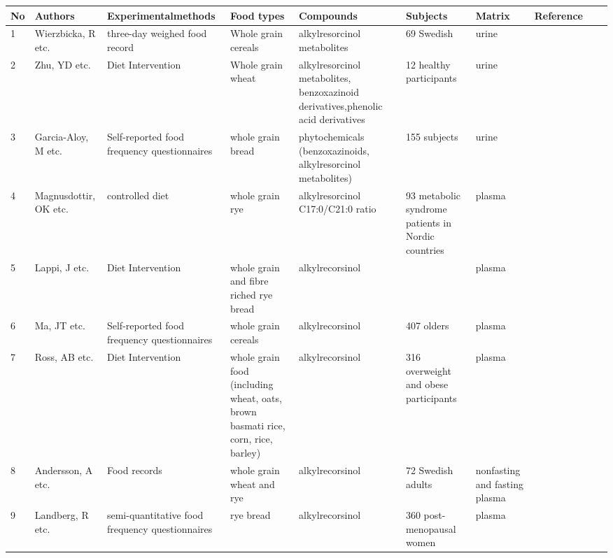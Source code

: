 \begin{center}
\scalebox{0.6}
{
\begin{small}


\begin{tabular}{|m{0.5cm}|m{1.8cm}|m{2.5cm}|m{2.5cm}|m{2.5cm}|m{2cm}|m{2cm}|m{2cm}|m{0.8cm}|m{0.3cm}}
 \hline
No & Authors & Experimental\newline methods & Food types & Compounds & Subjects & Matrix & Reference\\ \hline
1&	Wierzbicka, R etc.&	three-day weighed food record &	Whole grain cereals	&alkylresorcinol metabolites	& 69 Swedish	& urine &	\cite{ISI:000404730400012}\\ \hline
2&	Zhu, YD etc.&Diet Intervention&Whole grain wheat&alkylresorcinol metabolites,
benzoxazinoid derivatives,phenolic acid derivatives&12 healthy participants&urine&	\cite{ISI:000387249200001}\\ \hline
3&	Garcia-Aloy, M etc.&	Self-reported food frequency questionnaires&	whole grain bread	&phytochemicals (benzoxazinoids, alkylresorcinol metabolites) &	155 subjects	&urine	&\cite{ISI:000384784900008}\\ \hline
4&	Magnusdottir, OK etc.&	controlled diet&whole grain rye&	alkylresorcinol C17:0/C21:0 ratio&	93 metabolic syndrome patients in Nordic countries&	plasma&	\cite{ISI:000343662800061}\\ \hline
5&	Lappi, J etc.&	Diet Intervention&	whole grain and fibre riched rye bread&	alkylrecorsinol& &		plasma	&\cite{Sawicki2016}\\ \hline
6&	Ma, JT etc.	&Self-reported food frequency questionnaires&	whole grain cereals&	alkylrecorsinol&	407 olders	&plasma&	\cite{ISI:000309032000011}\\ \hline
7&	Ross, AB etc.&	Diet Intervention&	whole grain food (including wheat, oats, brown basmati rice, corn, rice, barley)&alkylrecorsinol&	316 overweight and obese participants&	plasma&	\cite{ISI:000298402100026}\\ \hline
8&	Andersson, A etc.&	Food records&	whole grain wheat and rye&	alkylrecorsinol&	72 Swedish adults&	nonfasting and fasting plasma&	\cite{ISI:000294523500019}\\ \hline
9&	Landberg, R etc. &	semi-quantitative food frequency questionnaires&	rye bread&	alkylrecorsinol&	360 post-menopausal women&	plasma&	\cite{Landberg2009}\\ \hline

\end{tabular}
\end{small}}
\end{center}
